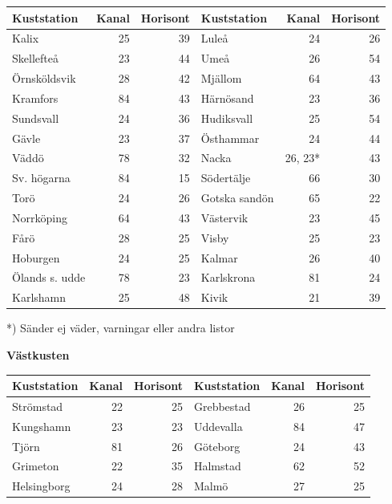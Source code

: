 \begin{longtable}{lrr|lrr}
\textbf{Kuststation} & \textbf{Kanal} & \textbf{Horisont} & \textbf{Kuststation} & \textbf{Kanal}& \textbf{Horisont}\\
\hline
\endhead
Kalix          & 25 & 39 & Luleå         & 24 & 26 \\
Skellefteå     & 23 & 44 & Umeå          & 26 & 54 \\
Örnsköldsvik   & 28 & 42 & Mjällom       & 64 & 43 \\
Kramfors       & 84 & 43 & Härnösand     & 23 & 36 \\
Sundsvall      & 24 & 36 & Hudiksvall    & 25 & 54 \\
Gävle          & 23 & 37 & Östhammar     & 24 & 44 \\
Väddö          & 78 & 32 & Nacka         & 26, 23* & 43 \\
Sv. högarna    & 84 & 15 & Södertälje    & 66 & 30 \\
Torö           & 24 & 26 & Gotska sandön & 65 & 22 \\
Norrköping     & 64 & 43 & Västervik     & 23 & 45 \\
Fårö           & 28 & 25 & Visby         & 25 & 23 \\
Hoburgen       & 24 & 25 & Kalmar        & 26 & 40 \\
Ölands s. udde & 78 & 23 & Karlskrona    & 81 & 24 \\
Karlshamn      & 25 & 48 & Kivik         & 21 & 39\\
\end{longtable}
*) Sänder ej väder, varningar eller andra listor

\clearpage
\textbf{Västkusten}

\begin{longtable}{lrr|lrr}
\textbf{Kuststation} & \textbf{Kanal} & \textbf{Horisont} & \textbf{Kuststation} & \textbf{Kanal} & \textbf{Horisont} \\
\hline
\endhead

Strömstad   & 22 & 25 & Grebbestad & 26 & 25 \\
Kungshamn   & 23 & 23 & Uddevalla  & 84 & 47 \\
Tjörn       & 81 & 26 & Göteborg   & 24 & 43 \\
Grimeton    & 22 & 35 & Halmstad   & 62 & 52 \\
Helsingborg & 24 & 28 & Malmö      & 27 & 25 \\
\end{longtable}

